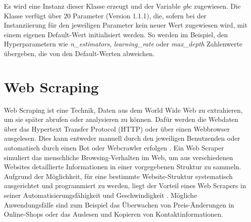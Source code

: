 \documentclass[german,bachelor]{swsLeipzig}
\begin{document}
\noindent Es wird eine Instanz dieser Klasse erzeugt und der Variable \textit{gbc} zugewiesen.
Die Klasse verfügt über 20 Parameter (Version 1.1.1), die, sofern bei der Instanziierung für den jeweiligen Parameter
kein neuer Wert zugewiesen wird, mit einem eigenen Default-Wert initialisiert werden.
So werden im Beispiel, den Hyperparametern wie \textit{n\_estimators}, \textit{learning\_rate} oder \textit{max\_depth}
Zahlenwerte übergeben, die von den Default-Werten abweichen.\\

\section{Web Scraping}
Web Scraping ist eine Technik, Daten aus dem World Wide Web zu extrahieren, um sie später abrufen oder analysieren zu können.
Dafür werden die Webdaten über das Hypertext Transfer Protocol (HTTP) oder über einen Webbrowser ausgelesen.
Dies kann entweder manuell durch den jeweiligen Benutzenden oder automatisch durch einen Bot oder Webcrawler erfolgen \cite[]{zhao2017web}.
Ein Web Scraper simuliert das menschliche Browsing-Verhalten im Web, um aus verschiedenen Websites
detaillierte Informationen in einer vorgegebenen Struktur zu sammeln.
Aufgrund der Möglichkeit, für eine bestimmte Website-Struktur systematisch ausgerichtet und programmiert zu werden, liegt der Vorteil
eines Web Scrapers in seiner Automatisierungsfähigkeit und Geschwindigkeit \cite[]{9005594}.
Mögliche Anwendungsfälle sind zum Beispiel das Überwachen von Preis-Änderungen in Online-Shops oder das Auslesen und Kopieren
von Kontaktinformationen.\\
\end{document}
